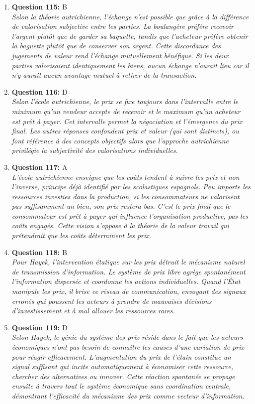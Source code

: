 \documentclass[12pt,a4paper]{article}
\begin{document}
\begin{enumerate}
\item \textbf{Question 115:} B
\\ \textit{Selon la théorie autrichienne, l'échange n'est possible que grâce à la différence de valorisation subjective entre les parties. La boulangère préfère recevoir l'argent plutôt que de garder sa baguette, tandis que l'acheteur préfère obtenir la baguette plutôt que de conserver son argent. Cette discordance des jugements de valeur rend l'échange mutuellement bénéfique. Si les deux parties valorisaient identiquement les biens, aucun échange n'aurait lieu car il n'y aurait aucun avantage mutuel à retirer de la transaction.}

\item \textbf{Question 116:} D
\\ \textit{Selon l'école autrichienne, le prix se fixe toujours dans l'intervalle entre le minimum qu'un vendeur accepte de recevoir et le maximum qu'un acheteur est prêt à payer. Cet intervalle permet la négociation et l'émergence du prix final. Les autres réponses confondent prix et valeur (qui sont distincts), ou font référence à des concepts objectifs alors que l'approche autrichienne privilégie la subjectivité des valorisations individuelles.}

\item \textbf{Question 117:} A
\\ \textit{L'école autrichienne enseigne que les coûts tendent à suivre les prix et non l'inverse, principe déjà identifié par les scolastiques espagnols. Peu importe les ressources investies dans la production, si les consommateurs ne valorisent pas suffisamment un bien, son prix restera bas. C'est le prix final que le consommateur est prêt à payer qui influence l'organisation productive, pas les coûts engagés. Cette vision s'oppose à la théorie de la valeur travail qui prétendrait que les coûts déterminent les prix.}

\item \textbf{Question 118:} B
\\ \textit{Pour Hayek, l'intervention étatique sur les prix détruit le mécanisme naturel de transmission d'information. Le système de prix libre agrège spontanément l'information dispersée et coordonne les actions individuelles. Quand l'État manipule les prix, il brise ce réseau de communication, envoyant des signaux erronés qui poussent les acteurs à prendre de mauvaises décisions d'investissement et à mal allouer les ressources rares.}

\item \textbf{Question 119:} D
\\ \textit{Selon Hayek, le génie du système des prix réside dans le fait que les acteurs économiques n'ont pas besoin de connaître les causes d'une variation de prix pour réagir efficacement. L'augmentation du prix de l'étain constitue un signal suffisant qui incite automatiquement à économiser cette ressource, chercher des alternatives ou innover. Cette réaction spontanée se propage ensuite à travers tout le système économique sans coordination centrale, démontrant l'efficacité du mécanisme des prix comme vecteur d'information.}


\end{enumerate}
\end{document}
